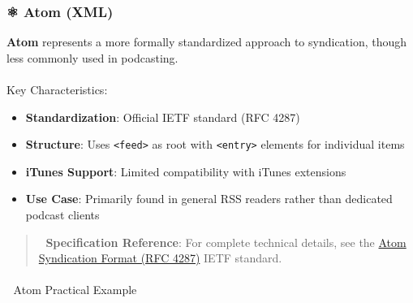 \documentclass[
  letterpaper,
  DIV=11,
  numbers=noendperiod]{scrartcl}
\makeatletter
\let\oldparagraph\paragraph
\renewcommand{\paragraph}{
    \@ifstar
      \xxxParagraphStar
      \xxxParagraphNoStar
  }
\newcommand{\xxxParagraphStar}[1]{\oldparagraph*{#1}\mbox{}}
\newcommand{\xxxParagraphNoStar}[1]{\oldparagraph{#1}\mbox{}}
\providecommand{\tightlist}{%
  \setlength{\itemsep}{0pt}\setlength{\parskip}{0pt}}\usepackage{longtable,booktabs,array}
\makeatother
\begin{document}
\subsubsection{⚛️ Atom (XML)}\label{atom-xml}

\textbf{Atom} represents a more formally standardized approach to
syndication, though less commonly used in podcasting.

\paragraph{Key Characteristics:}\label{key-characteristics-1}

\begin{itemize}
\tightlist
\item
  \textbf{Standardization}: Official IETF standard (RFC 4287)
\item
  \textbf{Structure}: Uses \texttt{\textless{}feed\textgreater{}} as
  root with \texttt{\textless{}entry\textgreater{}} elements for
  individual items
\item
  \textbf{iTunes Support}: Limited compatibility with iTunes extensions
\item
  \textbf{Use Case}: Primarily found in general RSS readers rather than
  dedicated podcast clients
\end{itemize}

\begin{quote}
📖 \textbf{Specification Reference}: For complete technical details, see
the \href{https://tools.ietf.org/html/rfc4287}{Atom Syndication Format
(RFC 4287)} IETF standard.
\end{quote}

\paragraph{📝 Atom Practical Example}\label{atom-practical-example}
\end{document}
